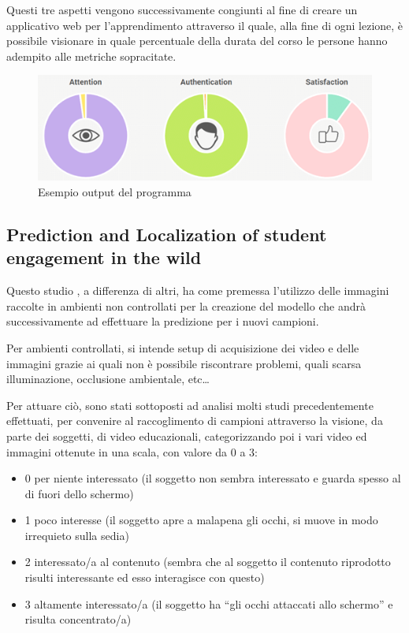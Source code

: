 Questi tre aspetti vengono successivamente congiunti al fine di creare un applicativo web per l’apprendimento attraverso il quale, alla fine di ogni lezione, è possibile visionare in quale percentuale della durata del corso le persone hanno adempito alle metriche sopracitate.

\begin{figure}
    \begin{center}    
        \includegraphics[width=1\linewidth]{images/3.png}
        \caption{Esempio output del programma}
    \end{center}
\end{figure}
 
\subsection{Prediction and Localization of student engagement in the wild}

Questo studio \cite{PredLocStudEngagInTheWild}, a differenza di altri, ha come premessa l’utilizzo delle immagini raccolte in ambienti non controllati per la creazione del modello che andrà successivamente ad effettuare la predizione per i nuovi campioni.

Per ambienti controllati, si intende setup di acquisizione dei video e delle immagini grazie ai quali non è possibile riscontrare problemi, quali scarsa illuminazione, occlusione ambientale, etc…

Per attuare ciò, sono stati sottoposti ad analisi molti studi precedentemente effettuati, per convenire al raccoglimento di campioni attraverso la visione, da parte dei soggetti, di video educazionali, categorizzando poi i vari video ed immagini ottenute in una scala, con valore da 0 a 3:
\begin{itemize}
    \item 0 \textrightarrow per niente interessato (il soggetto non sembra interessato e guarda spesso al di fuori dello schermo)
    \item 1 \textrightarrow poco interesse (il soggetto apre a malapena gli occhi, si muove in modo irrequieto sulla sedia)
    \item 2 \textrightarrow interessato/a al contenuto (sembra che al soggetto il contenuto riprodotto risulti interessante ed esso interagisce con questo)
    \item 3 \textrightarrow altamente interessato/a (il soggetto ha “gli occhi attaccati allo schermo” e risulta concentrato/a)
\end{itemize}


